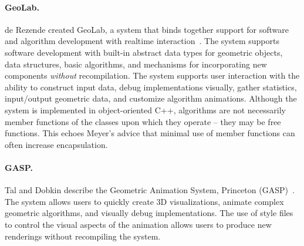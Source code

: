 \paragraph{GeoLab.}

de Rezende created GeoLab, a system that binds together support for software and
algorithm development with realtime interaction~\cite{de1993geolab,
de1993animation}. The system supports software development with built-in
abstract data types for geometric objects, data structures, basic algorithms,
and mechanisms for incorporating new components \emph{without} recompilation.
The system supports user interaction with the ability to construct input data,
debug implementations visually, gather statistics, input/output geometric data,
and customize algorithm animations. Although the system is implemented in
object-oriented C++, algorithms are not necessarily member functions of the
classes upon which they operate -- they may be free functions. This echoes
Meyer's advice that minimal use of member functions can often increase
encapsulation.



\paragraph{GASP.}

Tal and Dobkin describe the Geometric Animation System, Princeton
(GASP)~\cite{tal1995visualization}. The system allows users to quickly create 3D
visualizations, animate complex geometric algorithms, and visually debug
implementations. The use of style files to control the visual aspects of the
animation allows users to produce new renderings without recompiling the system.

